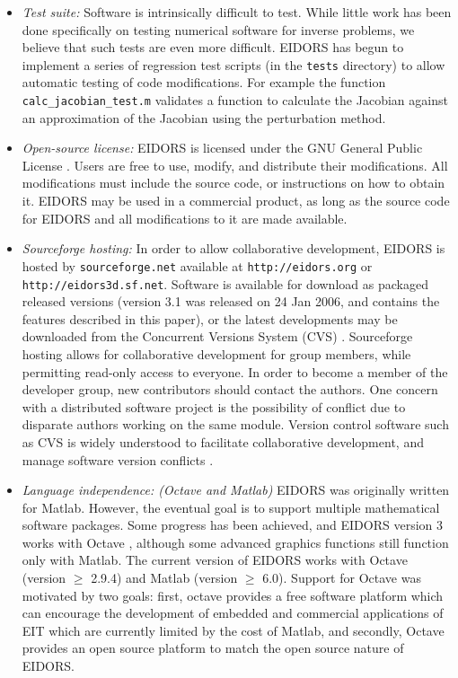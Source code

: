 \documentclass[12pt]{iopart}
\begin{document}
\begin{itemize}
  \item {\em Test suite:}
Software is intrinsically difficult to test. While little work
has been done specifically on testing numerical software
for inverse problems, we
believe that such tests are even more difficult.
EIDORS has begun to implement a series of regression test
scripts (in the {\tt tests} directory)
to allow automatic testing of code modifications.
For example the function {\tt calc\_jacobian\_test.m}
validates a function to calculate the Jacobian against
an approximation of the Jacobian using the perturbation method. 

  \item {\em Open-source license:}
EIDORS is licensed under the
GNU General Public License \cite{Free_Software_Foundation_1991}.
Users are free to use, modify, and
distribute their modifications. All modifications must include the
source code, or instructions on how to obtain it. EIDORS may be used
in a commercial product, as long as the source code for EIDORS and all
modifications to it are made available.

  \item {\em Sourceforge hosting:}
In order to allow collaborative development, 
EIDORS is hosted by {\tt sourceforge.net}
available at {\tt http://eidors.org} or {\tt http://eidors3d.sf.net}.
Software is available for download as packaged released versions
(version 3.1 was released on 24 Jan 2006, and
contains the features described in this paper),
or the latest developments may be downloaded from the
Concurrent Versions System (CVS) \cite{Cederqvist_2002}.
Sourceforge hosting allows for collaborative development for
group members, while permitting read-only access to everyone.
In order to become a member of the developer group, new
contributors should contact the authors.
One concern with a distributed software project is
the possibility of conflict due to disparate authors
working on the same module.
Version control software such as CVS is widely understood
to facilitate collaborative development, and manage
software version conflicts \cite{Cederqvist_2002}.


  \item {\em Language independence: (Octave and Matlab)}
EIDORS was originally written for Matlab.
However, the eventual goal is to support multiple
mathematical software packages.
Some progress has been achieved, and EIDORS version 3
works with Octave \cite{Eaton_2002}, although some 
advanced graphics functions still function only with Matlab.
The current version of EIDORS works with Octave
(version $\ge$ 2.9.4)
and Matlab (version $\ge$ 6.0).
Support for Octave was motivated by two goals:
first, octave provides a free software platform
which can encourage the development of embedded
and commercial applications of EIT which are
currently
limited by the cost of Matlab, and secondly,
Octave provides an open source platform to match
the open source nature of EIDORS.


\end{itemize}
\end{document}
